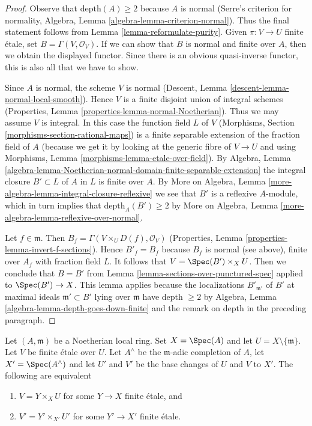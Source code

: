 \begin{proof}
Observe that $\text{depth}(A) \geq 2$ because $A$ is normal
(Serre's criterion for normality, Algebra, Lemma
\ref{algebra-lemma-criterion-normal}).
Thus the final statement follows from Lemma \ref{lemma-reformulate-purity}.
Given $\pi : V \to U$ finite \'etale, set $B = \Gamma(V, \mathcal{O}_V)$.
If we can show that $B$ is normal and finite over $A$, then
we obtain the displayed functor. Since there is an obvious
quasi-inverse functor, this is also all that we have to show.

\medskip\noindent
Since $A$ is normal, the scheme $V$ is normal
(Descent, Lemma \ref{descent-lemma-normal-local-smooth}).
Hence $V$ is a finite disjoint union of integral schemes
(Properties, Lemma \ref{properties-lemma-normal-Noetherian}).
Thus we may assume $V$ is integral.
In this case the function field $L$ of $V$
(Morphisms, Section \ref{morphisms-section-rational-maps})
is a finite separable extension of the fraction field of $A$
(because we get it by looking at the generic fibre
of $V \to U$ and using Morphisms, Lemma
\ref{morphisms-lemma-etale-over-field}).
By Algebra, Lemma
\ref{algebra-lemma-Noetherian-normal-domain-finite-separable-extension}
the integral closure $B' \subset L$ of $A$ in $L$ is finite over $A$.
By More on Algebra, Lemma \ref{more-algebra-lemma-integral-closure-reflexive}
we see that $B'$ is a reflexive $A$-module, which in turn implies
that $\text{depth}_A(B') \geq 2$ by
More on Algebra, Lemma \ref{more-algebra-lemma-reflexive-over-normal}.

\medskip\noindent
Let $f \in \mathfrak m$. Then $B_f = \Gamma(V \times_U D(f), \mathcal{O}_V)$
(Properties, Lemma \ref{properties-lemma-invert-f-sections}).
Hence $B'_f = B_f$ because $B_f$ is normal (see above),
finite over $A_f$ with fraction field $L$.
It follows that $V = \Spec(B') \times_X U$.
Then we conclude that $B = B'$ from
Lemma \ref{lemma-sections-over-punctured-spec}
applied to $\Spec(B') \to X$.
This lemma applies because the localizations $B'_{\mathfrak m'}$
of $B'$ at maximal ideals $\mathfrak m' \subset B'$ lying over
$\mathfrak m$ have depth $\geq 2$ by
Algebra, Lemma \ref{algebra-lemma-depth-goes-down-finite}
and the remark on depth in the preceding paragraph.
\end{proof}

\begin{lemma}
\label{lemma-purity-and-completion}
Let $(A, \mathfrak m)$ be a Noetherian local ring. Set $X = \Spec(A)$
and let $U = X \setminus \{\mathfrak m\}$.
Let $V$ be finite \'etale over $U$.
Let $A^\wedge$ be the $\mathfrak m$-adic completion of $A$,
let $X' = \Spec(A^\wedge)$ and let $U'$ and $V'$ be the base changes of
$U$ and $V$ to $X'$. The following are equivalent
\begin{enumerate}
\item $V = Y \times_X U$ for some $Y \to X$ finite \'etale, and
\item $V' = Y' \times_{X'} U'$ for some $Y' \to X'$ finite \'etale.
\end{enumerate}
\end{lemma}

